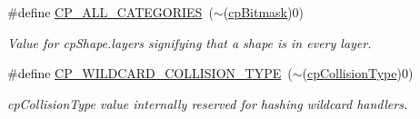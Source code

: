 \begin{DoxyCompactItemize}
\#define \mbox{\hyperlink{group__basic_types_ga591693fbd3ed24f3365ef7accf349d4f}{C\+P\+\_\+\+A\+L\+L\+\_\+\+C\+A\+T\+E\+G\+O\+R\+I\+ES}}~($\sim$(\mbox{\hyperlink{group__basic_types_gae7ff94f62e00cae288c1991958822743}{cp\+Bitmask}})0)
\begin{DoxyCompactList}\small\item\em Value for cp\+Shape.\+layers signifying that a shape is in every layer. \end{DoxyCompactList}\item 
\mbox{\label{group__basic_types_ga3c81e881eb469ffacbe318a5a991c5bc}} 
\#define \mbox{\hyperlink{group__basic_types_ga3c81e881eb469ffacbe318a5a991c5bc}{C\+P\+\_\+\+W\+I\+L\+D\+C\+A\+R\+D\+\_\+\+C\+O\+L\+L\+I\+S\+I\+O\+N\+\_\+\+T\+Y\+PE}}~($\sim$(\mbox{\hyperlink{group__basic_types_gae83e2f50965eb441e36ffff1e32e6d02}{cp\+Collision\+Type}})0)
\begin{DoxyCompactList}\small\item\em cp\+Collision\+Type value internally reserved for hashing wildcard handlers. \end{DoxyCompactList}\end{DoxyCompactItemize}
